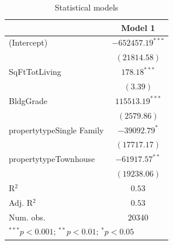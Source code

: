 \documentclass[12pt,a4paper,landscape]{article}
\begin{document}
\begin{table}[H]
	\begin{center}
		\begin{tabular}{l c}
			\hline
			& Model 1 \\
			\hline
			(Intercept)               & $-652457.19^{***}$ \\
			& $(21814.58)$       \\
			SqFtTotLiving             & $178.18^{***}$     \\
			& $(3.39)$           \\
			BldgGrade                 & $115513.19^{***}$  \\
			& $(2579.86)$        \\
			propertytypeSingle Family & $-39092.79^{*}$    \\
			& $(17717.17)$       \\
			propertytypeTownhouse     & $-61917.57^{**}$   \\
			& $(19238.06)$       \\
			\hline
			R$^2$                     & $0.53$             \\
			Adj. R$^2$                & $0.53$             \\
			Num. obs.                 & $20340$            \\
			\hline
			\multicolumn{2}{l}{\scriptsize{$^{***}p<0.001$; $^{**}p<0.01$; $^{*}p<0.05$}}
		\end{tabular}
		\caption{Statistical models}
		\label{table:coefficients}
	\end{center}
\end{table}
\end{document}
